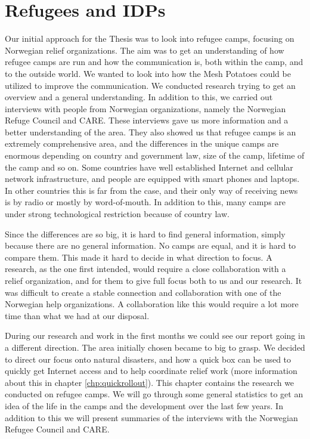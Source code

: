 \chapter{Refugees and IDPs}
\label{chp:refugeecamps} 
Our initial approach for the Thesis was to look into refugee camps, focusing on Norwegian relief organizations. The aim was to get an understanding of how refugee camps are run and how the communication is, both within the camp, and to the outside world. We wanted to look into how the Mesh Potatoes could be utilized to improve the communication. We conducted research trying to get an overview and a general understanding. In addition to this, we carried out interviews with people from Norwegian organizations, namely the Norwegian Refuge Council and CARE. These interviews gave us more information and a better understanding of the area. They also showed us that refugee camps is an extremely comprehensive area, and the differences in the unique camps are enormous depending on country and government law, size of the camp, lifetime of the camp and so on. Some countries have well established Internet and cellular network infrastructure, and people are equipped with smart phones and laptops. In other countries this is far from the case, and their only way of receiving news is by radio or mostly by word-of-mouth. In addition to this, many camps are under strong technological restriction because of country law. 

Since the differences are so big, it is hard to find general information, simply because there are no general information. No camps are equal, and it is hard to compare them. This made it hard to decide in what direction to focus. A research, as the one first intended, would require a close collaboration with a relief organization, and for them to give full focus both to us and our research. It was difficult to create a stable connection and collaboration with one of the Norwegian help organizations. A collaboration like this would require a lot more time than what we had at our disposal. 
  
During our research and work in the first months we could see our report going in a different direction. The area initially chosen became to big to grasp. We decided to direct our focus onto natural disasters, and how a \gls{quick} box can be used to quickly get Internet access and to help coordinate relief work (more information about this in chapter \ref{chp:quickrollout}).
This chapter contains the research we conducted on refugee camps. We will go through some general statistics to get an idea of the life in the camps and the development over the last few years. In addition to this we will present summaries of the interviews with the Norwegian Refugee Council and CARE.


